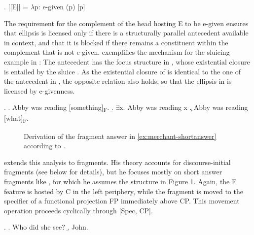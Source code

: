 \ex. [[E]] = $\lambda$p: e-given (p) [p] \hfill \citep[672]{merchant2004}

The requirement for the complement of the head hosting E to be e-given ensures that ellipsis is licensed only if there is a structurally parallel antecedent available in context, and that it is blocked if there remains a constituent within the complement that is not e-given. \Next exemplifies the mechanism for the sluicing example in \LLast: The antecedent has the focus structure in \Next[a], whose existential closure \Next[b] is entailed by the sluice \Next[c]. As the existential closure of \Next[c] is identical to the one of the antecedent in \Next[b], the opposite relation also holds, so that the ellipsis in \LLast is licensed by e-givenness.

\ex. \a. Abby was reading [something]\textsubscript{F}.
     \b. $\exists$x. Abby was reading x
     \c. Abby was reading [what]\textsubscript{F}.
     
\begin{figure}

\caption{Derivation of the fragment answer in \ref{ex:merchant-shortanswer} according to \citet{merchant2004}.\label{ex:merchant.structure-full}}
\end{figure}
%
\citet{merchant2004} extends this analysis to fragments. His theory accounts for discourse-initial fragments (see below for details), but he focuses mostly on short answer fragments like \Next, for which he assumes the structure in Figure \ref{ex:merchant.structure-full}. Again, the E feature is hosted by C in the left periphery, while the fragment is moved to the specifier of a functional projection FP immediately above CP. This movement operation proceeds cyclically through [Spec, CP].

\ex. \a. Who did she see? \hfill \citep[673]{merchant2004}
\b. John.\label{ex:merchant-shortanswer}


